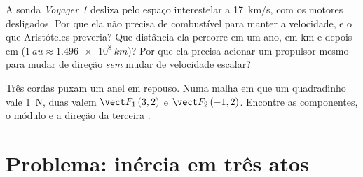 \begin{exercise}[$\star\star\star$]\label{exo:g10:inertia:14}
A sonda \emph{Voyager 1} desliza pelo espaço interestelar a
\qty{17}{km/s}, com os motores desligados. Por que ela não precisa de
combustível para manter a velocidade, e o que Aristóteles preveria? Que
distância ela percorre em um ano, em \unit{km} e depois em  ($\qty{1}{au} \approx \qty{1.496e8}{km}$)? Por que ela
precisa acionar um propulsor mesmo para mudar de direção \emph{sem} mudar
de velocidade escalar?
\end{exercise}

\begin{exercise}[$\star\star\star$]\label{exo:g10:inertia:15}
Três cordas puxam um anel em repouso. Numa malha em que um quadradinho
vale \qty{1}{N}, duas  valem $\vect F_1\,(3, 2)$ e
$\vect F_2\,(-1, 2)$. Encontre as componentes, o módulo e a direção da
terceira .
\end{exercise}

\section{Problema: inércia em três atos}

